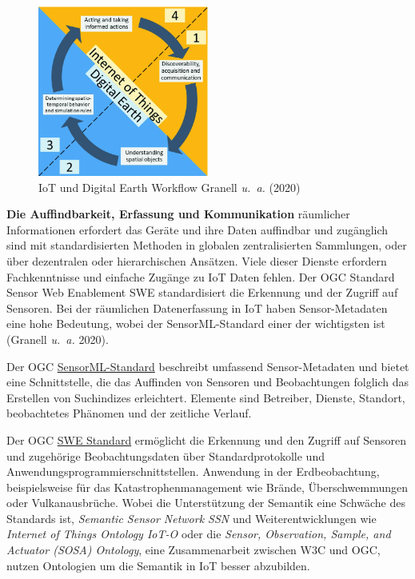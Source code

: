 \documentclass[
  11pt,
  a4paper,
  oneside, openany  ,captions=tableheading
]{scrbook}
\providecommand{\tightlist}{%
  \setlength{\itemsep}{0pt}\setlength{\parskip}{0pt}}
\theoremstyle{remark}
\begin{document}
\begin{figure}[H]

{\centering \includegraphics[width=0.5\textwidth,height=\textheight]{images/digital_earth_iot.png}

}

\caption{IoT und Digital Earth Workflow Granell \emph{u.~a.} (2020)}

\end{figure}%

\textbf{Die Auffindbarkeit, Erfassung und Kommunikation} räumlicher
Informationen erfordert das Geräte und ihre Daten auffindbar und
zugänglich sind mit standardisierten Methoden in globalen
zentralisierten Sammlungen, oder über dezentralen oder hierarchischen
Ansätzen. Viele dieser Dienste erfordern Fachkenntnisse und einfache
Zugänge zu IoT Daten fehlen. Der OGC Standard Sensor Web Enablement SWE
standardisiert die Erkennung und der Zugriff auf Sensoren. Bei der
räumlichen Datenerfassung in IoT haben Sensor-Metadaten eine hohe
Bedeutung, wobei der SensorML-Standard einer der wichtigsten ist
(Granell \emph{u.~a.} 2020).

\begin{description}
\tightlist
\item[Sensor Model Language SensorML-Standard\index{SensorML-Standard}]
Der OGC \href{https://www.ogc.org/standard/sensorml}{SensorML-Standard}
beschreibt umfassend Sensor-Metadaten und bietet eine Schnittstelle, die
das Auffinden von Sensoren und Beobachtungen folglich das Erstellen von
Suchindizes erleichtert. Elemente sind Betreiber, Dienste, Standort,
beobachtetes Phänomen und der zeitliche Verlauf.
\item[Sensor Web Enablement SWE standards
suite\index{Sensor Web Enablement SWE standards}]
Der OGC \href{https://www.ogc.org/standard/swes}{SWE Standard}
ermöglicht die Erkennung und den Zugriff auf Sensoren und zugehörige
Beobachtungsdaten über Standardprotokolle und
Anwendungsprogrammierschnittstellen. Anwendung in der Erdbeobachtung,
beispielsweise für das Katastrophenmanagement wie Brände,
Überschwemmungen oder Vulkanausbrüche. Wobei die Unterstützung der
Semantik eine Schwäche des Standards ist, \emph{Semantic Sensor Network
SSN} und Weiterentwicklungen wie \emph{Internet of Things Ontology
IoT-O} oder die \emph{Sensor, Observation, Sample, and Actuator (SOSA)
Ontology}, eine Zusammenarbeit zwischen W3C und OGC, nutzen Ontologien
um die Semantik in IoT besser abzubilden.
\end{description}
\end{document}
